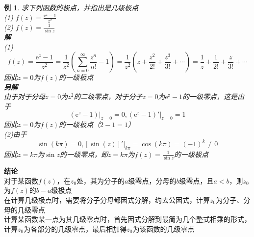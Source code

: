 \documentclass[12pt, a4paper, twoside]{ctexbook}
\newtheorem{example}[theorem]{例}
\begin{document}
\begin{example}
	求下列函数的极点，并指出是几级极点\\
	\hspace*{2em}(1) $f\left(z\right)=\frac{\mathrm{e}^z-1}{z^2}$\\
	\hspace*{2em}(2) $f\left(z\right)=\frac{1}{\sin z}$\\
	\hspace*{1em}\textbf{解}\\
	\hspace*{2em}(1)
	$$
	f\left(z\right)=\frac{\mathrm{e}^z-1}{z^2}=\frac{1}{z^2}\left(\sum_{n=0}^{\infty}\frac{z^n}{n!}-1\right)=\frac{1}{z^2}\left(z+\frac{z^2}{2!}+\frac{z^3}{3!}+\cdots\right)=\frac{1}{z}+\frac{1}{2!}+\frac{z}{3!}+\cdots
	$$
	\hspace*{2em}因此$z=0$为$f\left(z\right)$的一级极点\\
	\hspace*{1em}\textbf{另解}\\
	\hspace*{2em}由于对于分母$z=0$为$z^2$的二级零点，对于分子$z=0$为$\mathrm{e^z-1}$的一级零点，这是由于
	$$
	\left.\left(\mathrm{e}^z-1\right)\right|_{z=0}=0,\left.\left(\mathrm{e}^z-1\right)'\right|_{z=0}=1
	$$
	\hspace*{2em}因此$z=0$为$f\left(z\right)$的一级极点（$2-1=1$）\\
	\hspace*{2em}(2)由于
	$$
	\sin\left(k\pi\right)=0,\left.\left[\sin\left(z\right)\right]'\right|_{k\pi}=\cos \left(k\pi\right)=\left(-1\right)^k\neq 0
	$$
	\hspace*{2em}因此$z=k\pi$为$\sin z$的一级零点，即$z=k\pi$为$f\left(z\right)=\frac{1}{\sin z}$的一级极点
\end{example}
\textbf{结论}\\
	\hspace*{2em}对于某函数$f\left(z\right)$，在$z_0$处，其为分子的$a$级零点，分母的$b$级零点，且$a<b$，则$z_0$为$f\left(z\right)$的$b-a$级极点\\
	\hspace*{2em}在计算几级极点时，需要将分子分母都因式分解，约去公因式，计算$z_0$为分子、分母的几级零点\\
	\hspace*{2em}计算某函数某一点为其几级零点时，首先因式分解到最简为几个整式相乘的形式，计算$z_0$为各部分的几级零点，最后相加得$z_0$为该函数的几级零点
\end{document}
